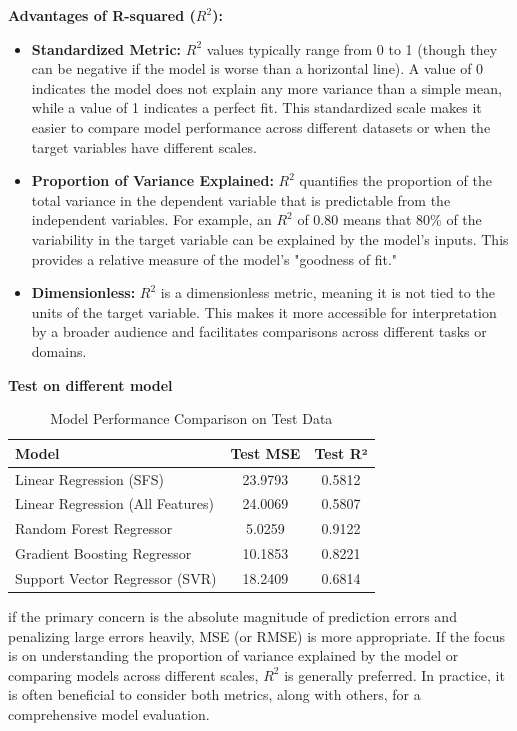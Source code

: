 \documentclass{article}
\begin{document}
\textbf{Advantages of R-squared ($R^2$):}
\begin{itemize}
    \item \textbf{Standardized Metric:} $R^2$ values typically range from 0 to 1 (though they can be negative if the model is worse than a horizontal line). A value of 0 indicates the model does not explain any more variance than a simple mean, while a value of 1 indicates a perfect fit. This standardized scale makes it easier to compare model performance across different datasets or when the target variables have different scales.
    \item \textbf{Proportion of Variance Explained:} $R^2$ quantifies the proportion of the total variance in the dependent variable that is predictable from the independent variables. For example, an $R^2$ of 0.80 means that 80\% of the variability in the target variable can be explained by the model's inputs. This provides a relative measure of the model's "goodness of fit."
    \item \textbf{Dimensionless:} $R^2$ is a dimensionless metric, meaning it is not tied to the units of the target variable. This makes it more accessible for interpretation by a broader audience and facilitates comparisons across different tasks or domains.
\end{itemize}

\textbf{Test on different model}
\begin{table}[h]
    \centering
    \caption{Model Performance Comparison on Test Data}
    \label{tab:model_performance}
    \begin{tabular}{|l|c|c|}
        \hline
        \textbf{Model} & \textbf{Test MSE} & \textbf{Test R²} \\
        \hline
        Linear Regression (SFS) & 23.9793 & 0.5812 \\
        Linear Regression (All Features) & 24.0069 & 0.5807 \\
        Random Forest Regressor & 5.0259 & 0.9122 \\
        Gradient Boosting Regressor & 10.1853 & 0.8221 \\
        Support Vector Regressor (SVR) & 18.2409 & 0.6814 \\
        \hline
    \end{tabular}
\end{table}

if the primary concern is the absolute magnitude of prediction errors and penalizing large errors heavily, MSE (or RMSE) is more appropriate. If the focus is on understanding the proportion of variance explained by the model or comparing models across different scales, $R^2$ is generally preferred. In practice, it is often beneficial to consider both metrics, along with others, for a comprehensive model evaluation.
\end{document}
